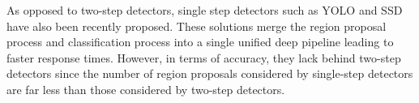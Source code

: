 As opposed to two-step detectors, single step detectors such as YOLO\cite{redmon2016you,redmon2018yolov3} and SSD\cite{liu2016ssd} have also been recently proposed. These solutions merge the region proposal process and classification process into a single unified deep pipeline leading to faster response times. However, in terms of accuracy, they lack behind two-step detectors since the number of region proposals considered by single-step detectors are far less than those considered by two-step detectors. 










